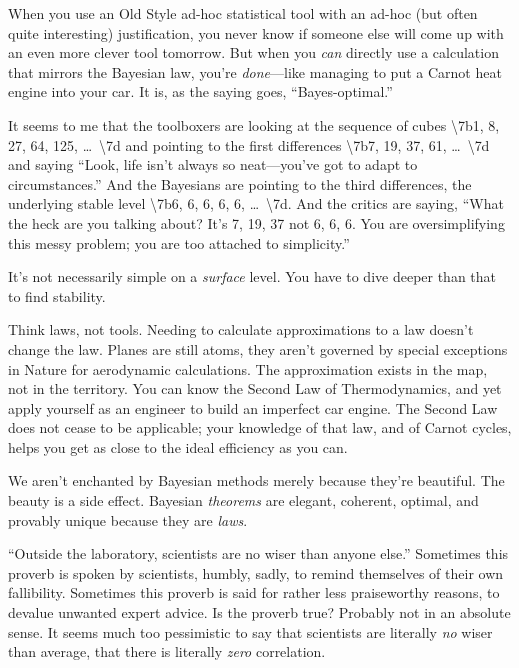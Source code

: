 {
 When you use an Old Style ad-hoc statistical tool with an ad-hoc
(but often quite interesting) justification, you never know if someone
else will come up with an even more clever tool tomorrow. But when you
\textit{can} directly use a calculation that mirrors the Bayesian law,
you're \textit{done}{}---like managing to put a Carnot
heat engine into your car. It is, as the saying goes,
``Bayes-optimal.''}

{
 It seems to me that the toolboxers are looking at the sequence of
cubes {\textbackslash}{\textquotesingle}7b1, 8, 27, 64, 125,
\ldots~{\textbackslash}{\textquotesingle}7d and pointing to the first
differences {\textbackslash}{\textquotesingle}7b7, 19, 37, 61,
\ldots~{\textbackslash}{\textquotesingle}7d and saying
``Look, life isn't always so
neat---you've got to adapt to
circumstances.'' And the Bayesians are pointing to
the third differences, the underlying stable level
{\textbackslash}{\textquotesingle}7b6, 6, 6, 6, 6,
\ldots~{\textbackslash}{\textquotesingle}7d. And the critics are saying,
``What the heck are you talking about?
It's 7, 19, 37 not 6, 6, 6. You are oversimplifying
this messy problem; you are too attached to
simplicity.''}

{
 It's not necessarily simple on a \textit{surface}
level. You have to dive deeper than that to find stability.}

{
 Think laws, not tools. Needing to calculate approximations to a
law doesn't change the law. Planes are still atoms,
they aren't governed by special exceptions in Nature
for aerodynamic calculations. The approximation exists in the map, not
in the territory. You can know the Second Law of Thermodynamics, and
yet apply yourself as an engineer to build an imperfect car engine. The
Second Law does not cease to be applicable; your knowledge of that law,
and of Carnot cycles, helps you get as close to the ideal efficiency as
you can.}

{
 We aren't enchanted by Bayesian methods merely
because they're beautiful. The beauty is a side effect.
Bayesian \textit{theorems} are elegant, coherent, optimal, and provably
unique because they are \textit{laws}.}

\myendsectiontext


\bigskip


{
 ``Outside the laboratory, scientists are no wiser
than anyone else.'' Sometimes this proverb is spoken
by scientists, humbly, sadly, to remind themselves of their own
fallibility. Sometimes this proverb is said for rather less
praiseworthy reasons, to devalue unwanted expert advice. Is the proverb
true? Probably not in an absolute sense. It seems much too pessimistic
to say that scientists are literally \textit{no} wiser than average,
that there is literally \textit{zero} correlation. }

